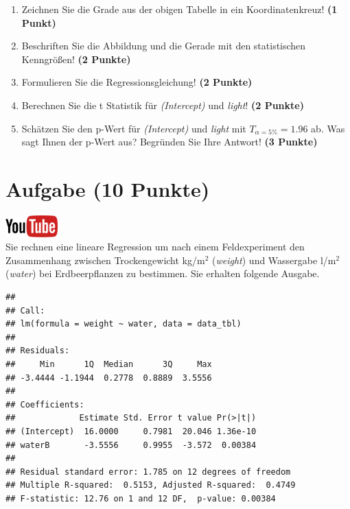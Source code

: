 \documentclass[a4paper, 9pt]{scrartcl}\usepackage[]{graphicx}\usepackage[]{xcolor}
\makeatletter
\newenvironment{kframe}{%
 \def\at@end@of@kframe{}%
 \ifinner\ifhmode%
  \def\at@end@of@kframe{\end{minipage}}%
  \begin{minipage}{\columnwidth}%
 \fi\fi%
 \def\FrameCommand##1{\hskip\@totalleftmargin \hskip-\fboxsep
 \colorbox{shadecolor}{##1}\hskip-\fboxsep
     \hskip-\linewidth \hskip-\@totalleftmargin \hskip\columnwidth}%
 \MakeFramed {\advance\hsize-\width
   \@totalleftmargin\z@ \linewidth\hsize
   \@setminipage}}%
 {\par\unskip\endMakeFramed%
 \at@end@of@kframe}
\newenvironment{knitrout}{}{} %
\makeatother
\begin{document}
\begin{enumerate}
\item Zeichnen Sie die Grade aus der obigen Tabelle in ein Koordinatenkreuz! \textbf{(1 Punkt)}
\item Beschriften Sie die Abbildung und die Gerade mit den statistischen
  Kenngr{\"o}{\ss}en! \textbf{(2 Punkte)}
\item Formulieren Sie die Regressionsgleichung! \textbf{(2 Punkte)}
\item Berechnen Sie die t Statistik f{\"u}r \textit{(Intercept)} und
  \textit{light}! \textbf{(2 Punkte)}
\item Sch{\"a}tzen Sie den p-Wert f{\"u}r \textit{(Intercept)} und
  \textit{light} mit $T_{\alpha = 5\%} = 1.96$ ab. Was sagt Ihnen der p-Wert aus?
  Begr{\"u}nden Sie Ihre Antwort! \textbf{(3 Punkte)}
\end{enumerate} 
\clearpage

\section{Aufgabe \hfill (10 Punkte)}

\hfill\href{https://youtu.be/tNNzcndrpSk}{\includegraphics[width =
  2cm]{img/youtube}}\\[1Ex]

Sie rechnen eine lineare Regression um nach einem Feldexperiment den
Zusammenhang zwischen Trockengewicht kg/m$^2$ (\textit{weight}) und
Wassergabe l/m$^2$ (\textit{water}) bei Erdbeerpflanzen zu bestimmen. Sie
erhalten folgende \Rlogo Ausgabe.

\begin{knitrout}
\color{fgcolor}\begin{kframe}
\begin{verbatim}
## 
## Call:
## lm(formula = weight ~ water, data = data_tbl)
## 
## Residuals:
##     Min      1Q  Median      3Q     Max 
## -3.4444 -1.1944  0.2778  0.8889  3.5556 
## 
## Coefficients:
##             Estimate Std. Error t value Pr(>|t|)
## (Intercept)  16.0000     0.7981  20.046 1.36e-10
## waterB       -3.5556     0.9955  -3.572  0.00384
## 
## Residual standard error: 1.785 on 12 degrees of freedom
## Multiple R-squared:  0.5153,	Adjusted R-squared:  0.4749 
## F-statistic: 12.76 on 1 and 12 DF,  p-value: 0.00384
\end{verbatim}
\end{kframe}
\end{knitrout}
\end{document}
